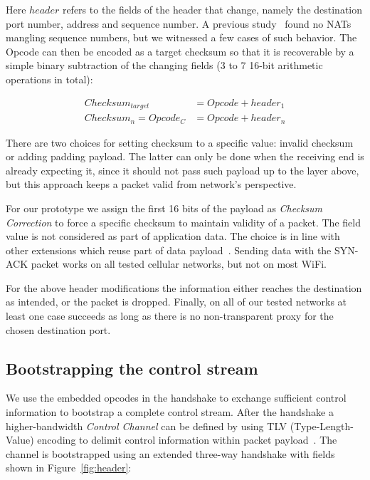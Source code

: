 \documentclass{sig-alternate-10pt}
\begin{document}
Here $header$ refers to the fields of the header that change, namely the destination port number, address and sequence number. A previous study~\cite{UntoldMiddlebox2011} found no NATs mangling sequence numbers, but we witnessed a few cases of such behavior. The Opcode can then be encoded as a target checksum so that it is recoverable by a simple binary subtraction of the changing fields (3 to 7 16-bit arithmetic operations in total):

\begin{align*}
Checksum_{target} & = Opcode + header_1 \\
Checksum_n = Opcode_C & = Opcode + header_n
\end{align*}

There are two choices for setting checksum to a specific value: invalid checksum or adding padding payload. The latter can only be done when the receiving end is already expecting it, since it should not pass such payload up to the layer above, but this approach keeps a packet valid from network's perspective.

For our prototype we assign the first 16 bits of the payload as \emph{Checksum Correction} to force a specific checksum to maintain validity of a packet. The field value is not considered as part of application data. The choice is in line with other extensions which reuse part of data payload~\cite{Mazieres:uz,Bonaventure:wx}. Sending data with the SYN-ACK packet works on all tested cellular networks, but not on most WiFi.

For the above header modifications the information either reaches the destination as intended, or the packet is dropped. Finally, on all of our tested networks at least one case succeeds as long as there is no non-transparent proxy for the chosen destination port.

\subsection{Bootstrapping the control stream}

We use the embedded opcodes in the handshake to exchange sufficient control information to bootstrap a complete control stream. After the handshake a higher-bandwidth \emph{Control Channel} can be defined by using TLV (Type-Length-Value) encoding to delimit control information within packet payload~\cite{Bonaventure:wx}. The channel is bootstrapped using an extended three-way handshake with fields shown in Figure~\ref{fig:header}:
\end{document}
